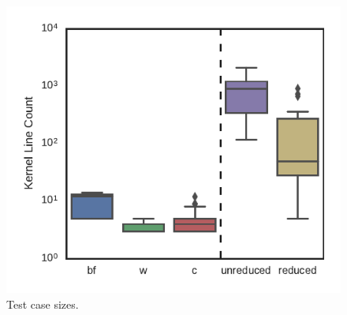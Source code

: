 \begin{figure}
  \centering %
    \includegraphics[width=\columnwidth]{build/img/kernel-sizes}%
  \caption{%
  	Test case sizes.%
  }%
  \label{fig:kernel-sizes} %
\end{figure}

